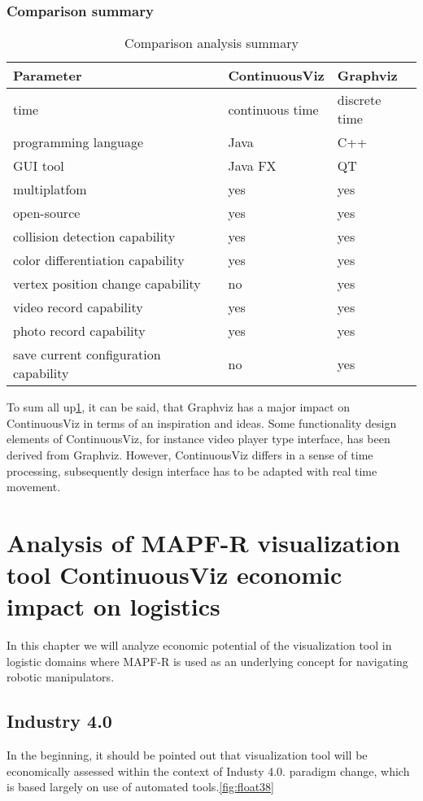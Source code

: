 \documentclass[thesis=B,english]{FITthesis}[2019/12/23]
\begin{document}
\subsection{Comparison summary}

\begin{table}[h]\label{fig:float100}
\centering
\caption[Comparison analysis summary]{Comparison analysis summary}
\begin{tabular}{|l|l|l|}\hline
Parameter		& ContinuousViz & Graphviz
\tabularnewline \hline \hline
time & continuous time & discrete time
\tabularnewline \hline \hline
programming language & Java & C++
\tabularnewline \hline \hline
GUI tool & Java FX & QT
\tabularnewline \hline 
multiplatfom & yes & yes
\tabularnewline \hline
open-source & yes & yes
\tabularnewline \hline
collision detection capability & yes & yes
\tabularnewline \hline
color differentiation capability & yes & yes
\tabularnewline \hline
vertex position change capability & no & yes 
\tabularnewline \hline
video record capability & yes & yes
\tabularnewline \hline
photo record capability & yes & yes
\tabularnewline \hline
save current configuration capability & no & yes
\tabularnewline \hline 
\end{tabular}
\end{table}


To sum all up\ref{fig:float100}, it can be said, that Graphviz has a major impact on ContinuousViz in terms of an inspiration and ideas. Some functionality design elements of ContinuousViz, for instance video player type interface, has been derived from Graphviz. However, ContinuousViz differs in a sense of time processing, subsequently design interface has to be adapted with real time movement.


\chapter{Analysis of MAPF-R visualization tool ContinuousViz economic impact on logistics}

In this chapter we will analyze economic potential of the visualization tool in logistic domains where MAPF-R is used as an underlying concept for navigating robotic manipulators.

\section{Industry 4.0}

In the beginning, it should be pointed out that visualization tool will be economically assessed  within the context of Industy 4.0. paradigm change, which is based largely on use of automated tools.\ref{fig:float38}
 
\end{document}
